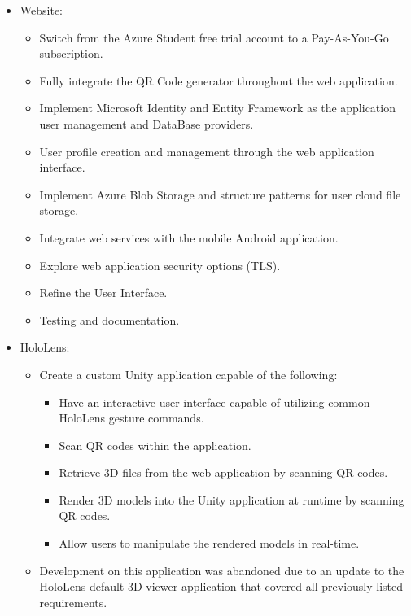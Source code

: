 	\begin{itemize}
		\item Website:
		\begin{itemize}
			\item Switch from the Azure Student free trial account to a Pay-As-You-Go subscription.
			\item Fully integrate the QR Code generator throughout the web application.
			\item Implement Microsoft Identity and Entity Framework as the application user management and DataBase providers.
			\item User profile creation and management through the web application interface.
			\item Implement Azure Blob Storage and structure patterns for user cloud file storage.
			\item Integrate web services with the mobile Android application.
			\item Explore web application security options (TLS).
			\item Refine the User Interface.
			\item Testing and documentation.
		\end{itemize}

		\item HoloLens:
		\begin{itemize}
			\item Create a custom Unity application capable of the following:
				\begin{itemize}
					\item Have an interactive user interface capable of utilizing common HoloLens gesture commands.
					\item Scan QR codes within the application.
					\item Retrieve 3D files from the web application by scanning QR codes.
					\item Render 3D models into the Unity application at runtime by scanning QR codes.
					\item Allow users to manipulate the rendered models in real-time.
				\end{itemize}
			\item Development on this application was abandoned due to an update to the HoloLens default 3D viewer application that covered all previously listed requirements.
		\end{itemize}


\end{itemize}
